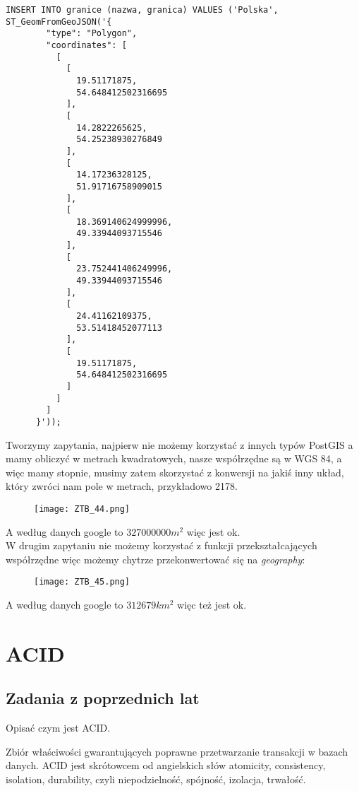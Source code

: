 \documentclass[a4paper,15pt]{article}
\newcommand{\egz}[2]{
    \begin{tcolorbox}[colback=mRed!5!white,colframe=mRed,title={Egzamin #1}]
        #2
    \end{tcolorbox}
}
\begin{document}
\begin{lstlisting}
INSERT INTO granice (nazwa, granica) VALUES ('Polska', ST_GeomFromGeoJSON('{
        "type": "Polygon",
        "coordinates": [
          [
            [
              19.51171875,
              54.648412502316695
            ],
            [
              14.2822265625,
              54.25238930276849
            ],
            [
              14.17236328125,
              51.91716758909015
            ],
            [
              18.369140624999996,
              49.33944093715546
            ],
            [
              23.752441406249996,
              49.33944093715546
            ],
            [
              24.41162109375,
              53.51418452077113
            ],
            [
              19.51171875,
              54.648412502316695
            ]
          ]
        ]
      }'));
\end{lstlisting}

Tworzymy zapytania, najpierw nie możemy korzystać z innych typów PostGIS a mamy obliczyć w metrach kwadratowych, nasze współrzędne są w WGS 84, a więc mamy stopnie, musimy zatem skorzystać z konwersji na jakiś inny układ, który zwróci nam pole w metrach, przykładowo 2178.

\begin{figure}[H]
\centering
  \texttt{[image: ZTB\_44.png]}
\end{figure}


A według danych google to $327 000 000m^2$ więc jest ok. \\

W drugim zapytaniu nie możemy korzystać z funkcji przekształcających współrzędne więc możemy chytrze przekonwertować się na \textit{geography}:

 \begin{figure}[H]
\centering
  \texttt{[image: ZTB\_45.png]}
\end{figure}

A według danych google to $312 679 km^2$ więc też jest ok.


\newpage
\section{ACID}
\subsection{Zadania z poprzednich lat}
\egz{}{
Opisać czym jest ACID.
}
Zbiór właściwości gwarantujących poprawne przetwarzanie transakcji w bazach danych. ACID jest skrótowcem od angielskich słów atomicity, consistency, isolation, durability, czyli niepodzielność, spójność, izolacja, trwałość.
\end{document}
